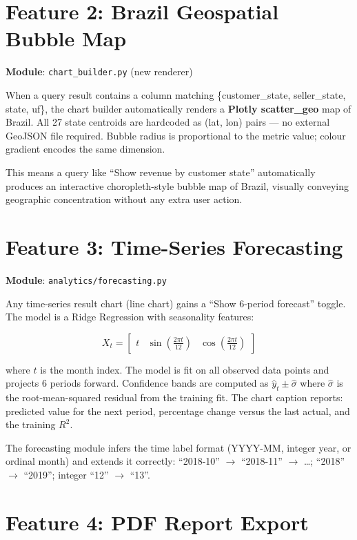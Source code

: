 \documentclass[12pt,a4paper]{report}
\newenvironment{infobox}[1]{%
  \begin{tcolorbox}[enhanced,breakable,
    colback=AccentBlue!8,colframe=AccentBlue!50,
    title={\faInfoCircle\quad#1},
    fonttitle=\bfseries\small\color{AccentBlue},
    coltitle=AccentBlue,
    boxrule=0.6pt,arc=4pt]
}{\end{tcolorbox}}
\begin{document}
\section{Feature 2: Brazil Geospatial Bubble Map}

\textbf{Module}: \texttt{chart\_builder.py} (new renderer)

When a query result contains a column matching \{customer\_state, seller\_state, state, uf\},
the chart builder automatically renders a \textbf{Plotly scatter\_geo} map of Brazil. All 27
state centroids are hardcoded as (lat, lon) pairs — no external GeoJSON file required. Bubble
radius is proportional to the metric value; colour gradient encodes the same dimension.

This means a query like ``Show revenue by customer state'' automatically produces an interactive
choropleth-style bubble map of Brazil, visually conveying geographic concentration without any
extra user action.

\section{Feature 3: Time-Series Forecasting}

\textbf{Module}: \texttt{analytics/forecasting.py}

Any time-series result chart (line chart) gains a ``Show 6-period forecast'' toggle. The model
is a Ridge Regression with seasonality features:

\[
X_t = \begin{bmatrix} t & \sin\!\left(\frac{2\pi t}{12}\right) & \cos\!\left(\frac{2\pi t}{12}\right) \end{bmatrix}
\]

where $t$ is the month index. The model is fit on all observed data points and projects 6 periods
forward. Confidence bands are computed as $\hat{y}_t \pm \hat{\sigma}$ where $\hat{\sigma}$ is
the root-mean-squared residual from the training fit. The chart caption reports: predicted value
for the next period, percentage change versus the last actual, and the training $R^2$.

\begin{infobox}{Label Extension Logic}
  The forecasting module infers the time label format (YYYY-MM, integer year, or ordinal
  month) and extends it correctly: ``2018-10'' $\to$ ``2018-11'' $\to$ \ldots ; ``2018'' $\to$
  ``2019''; integer ``12'' $\to$ ``13''.
\end{infobox}

\section{Feature 4: PDF Report Export}
\end{document}

